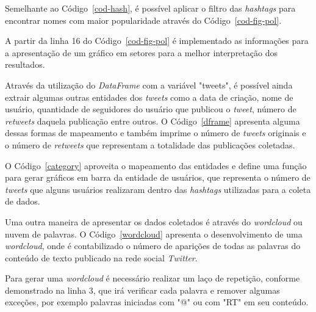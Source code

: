 

Semelhante ao Código~\ref{cod-hash}, é possível aplicar o filtro das \textit{hashtags} para encontrar nomes com maior popularidade através do Código~\ref{cod-fig-pol}.



A partir da linha 16 do Código~\ref{cod-fig-pol} é implementado as informações para a apresentação de um gráfico em setores para a melhor interpretação dos resultados.

Através da utilização do \textit{DataFrame} com a variável "tweets", é possível ainda extrair algumas outras entidades dos \textit{tweets} como a data de criação, nome de usuário, quantidade de seguidores do usuário que publicou o \textit{tweet}, número de \textit{retweets} daquela publicação entre outros. O Código~\ref{dframe} apresenta alguma dessas formas de mapeamento e também imprime o número de \textit{tweets} originais e o número de \textit{retweets} que representam a totalidade das publicações coletadas.



O Código~\ref{category} aproveita o mapeamento das entidades e define uma função para gerar gráficos em barra da entidade de usuários, que representa o número de \textit{tweets} que alguns usuários realizaram dentro das \textit{hashtags} utilizadas para a coleta de dados.



Uma outra maneira de apresentar os dados coletados é através do \textit{wordcloud} ou nuvem de palavras. O Código~\ref{wordcloud} apresenta o desenvolvimento de uma \textit{wordcloud}, onde é contabilizado o número de aparições de todas as palavras do conteúdo de texto publicado na rede social \textit{Twitter}.

Para gerar uma \textit{wordcloud} é necessário realizar um laço de repetição, conforme demonstrado na linha 3, que irá verificar cada palavra e remover algumas exceções, por exemplo palavras iniciadas com "@" \space ou com "RT" \space em seu conteúdo.

